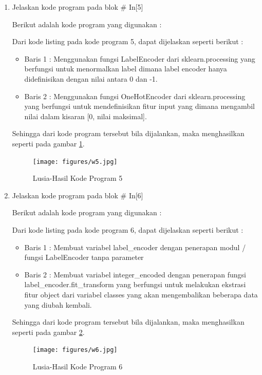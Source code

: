 \begin{enumerate}
\item Jelaskan kode program pada blok \# In[5]
	\par Berikut adalah kode program yang digunakan :
	
	\par Dari kode listing pada kode program 5, dapat dijelaskan seperti berikut :
	\begin{itemize}
	\item Baris 1	: Menggunakan fungsi LabelEncoder dari sklearn.processing yang berfungsi untuk menormalkan label dimana label encoder hanya didefinisikan dengan nilai antara 0 dan -1.
	\item Baris 2	: Menggunakan fungsi OneHotEncoder dari sklearn.processing yang berfungsi untuk mendefinisikan fitur input yang dimana mengambil nilai dalam kisaran [0, nilai maksimal].
	\end{itemize}
	\par Sehingga dari kode program tersebut bila dijalankan, maka menghasilkan seperti pada gambar \ref{7B5}.
		\begin{figure}[!hbtp]
		\centering
		\texttt{[image: figures/w5.jpg]}
		\caption{Lusia-Hasil Kode Program 5}
		\label{7B5}
		\end{figure}
	
\item Jelaskan kode program pada blok \# In[6]
	\par Berikut adalah kode program yang digunakan :
	
	\par Dari kode listing pada kode program 6, dapat dijelaskan seperti berikut :
	\begin{itemize}
	\item Baris 1	: Membuat variabel label\_encoder dengan penerapan modul / fungsi LabelEncoder tanpa parameter
	\item Baris 2	: Membuat variabel integer\_encoded dengan penerapan fungsi label\_encoder.fit\_transform yang berfungsi untuk melakukan ekstrasi fitur object dari variabel classes yang akan mengembalikan beberapa data yang diubah kembali.
	\end{itemize}
	\par Sehingga dari kode program tersebut bila dijalankan, maka menghasilkan seperti pada gambar \ref{7B6}.
		\begin{figure}[!hbtp]
		\centering
		\texttt{[image: figures/w6.jpg]}
		\caption{Lusia-Hasil Kode Program 6}
		\label{7B6}
		\end{figure}


\end{enumerate}
